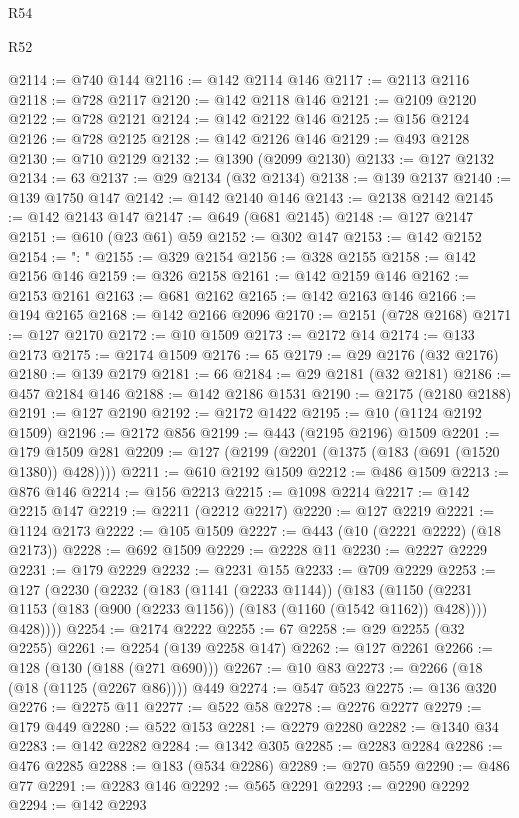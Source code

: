 \begin{lexlean}{R54}
\begin{lexlean}{R52}
\begin{coremodule}
{{{{{{{{{{{{{{{{{{{{{{{{{{{{{{{{{{{{{{{{{{{{{{{{{{{{{{{{{{{{{{{{{{{{{{{{{{{{{{{{{{{{{{{{{{{{{{{{{{{{{{{{{{{{{{{{{{{{{{{{{{{{{{{{{{{{{{{{{{{{{{{{{{{{{{{{{{{{{{{{{{{{{{{{{{{{{{{{{{{{{{{{{{{{{{{{{{{{{{@2114 := @740 @144
@2116 := @142 @2114 @146
@2117 := @2113 @2116
@2118 := @728 @2117
@2120 := @142 @2118 @146
@2121 := @2109 @2120
@2122 := @728 @2121
@2124 := @142 @2122 @146
@2125 := @156 @2124
@2126 := @728 @2125
@2128 := @142 @2126 @146
@2129 := @493 @2128
@2130 := @710 @2129
@2132 := @1390 (@2099 @2130)
@2133 := @127 @2132
@2134 := 63
@2137 := @29 @2134 (@32 @2134)
@2138 := @139 @2137
@2140 := @139 @1750 @147
@2142 := @142 @2140 @146
@2143 := @2138 @2142
@2145 := @142 @2143 @147
@2147 := @649 (@681 @2145)
@2148 := @127 @2147
@2151 := @610 (@23 @61) @59
@2152 := @302 @147
@2153 := @142 @2152
@2154 := ": "
@2155 := @329 @2154
@2156 := @328 @2155
@2158 := @142 @2156 @146
@2159 := @326 @2158
@2161 := @142 @2159 @146
@2162 := @2153 @2161
@2163 := @681 @2162
@2165 := @142 @2163 @146
@2166 := @194 @2165
@2168 := @142 @2166 @2096
@2170 := @2151 (@728 @2168)
@2171 := @127 @2170
@2172 := @10 @1509
@2173 := @2172 @14
@2174 := @133 @2173
@2175 := @2174 @1509
@2176 := 65
@2179 := @29 @2176 (@32 @2176)
@2180 := @139 @2179
@2181 := 66
@2184 := @29 @2181 (@32 @2181)
@2186 := @457 @2184 @146
@2188 := @142 @2186 @1531
@2190 := @2175 (@2180 @2188)
@2191 := @127 @2190
@2192 := @2172 @1422
@2195 := @10 (@1124 @2192 @1509)
@2196 := @2172 @856
@2199 := @443 (@2195 @2196) @1509
@2201 := @179 @1509 @281
@2209 := @127 (@2199 (@2201 (@1375 (@183 (@691 (@1520 @1380)) @428))))
@2211 := @610 @2192 @1509
@2212 := @486 @1509
@2213 := @876 @146
@2214 := @156 @2213
@2215 := @1098 @2214
@2217 := @142 @2215 @147
@2219 := @2211 (@2212 @2217)
@2220 := @127 @2219
@2221 := @1124 @2173
@2222 := @105 @1509
@2227 := @443 (@10 (@2221 @2222) (@18 @2173))
@2228 := @692 @1509
@2229 := @2228 @11
@2230 := @2227 @2229
@2231 := @179 @2229
@2232 := @2231 @155
@2233 := @709 @2229
@2253 := @127
    (@2230
      (@2232
        (@183
          (@1141 (@2233 @1144))
          (@183
            (@1150 (@2231 @1153 (@183 (@900 (@2233 @1156)) (@183 (@1160 (@1542 @1162)) @428))))
            @428))))
@2254 := @2174 @2222
@2255 := 67
@2258 := @29 @2255 (@32 @2255)
@2261 := @2254 (@139 @2258 @147)
@2262 := @127 @2261
@2266 := @128 (@130 (@188 (@271 @690)))
@2267 := @10 @83
@2273 := @2266 (@18 (@18 (@1125 (@2267 @86)))) @449
@2274 := @547 @523
@2275 := @136 @320
@2276 := @2275 @11
@2277 := @522 @58
@2278 := @2276 @2277
@2279 := @179 @449
@2280 := @522 @153
@2281 := @2279 @2280
@2282 := @1340 @34
@2283 := @142 @2282
@2284 := @1342 @305
@2285 := @2283 @2284
@2286 := @476 @2285
@2288 := @183 (@534 @2286)
@2289 := @270 @559
@2290 := @486 @77
@2291 := @2283 @146
@2292 := @565 @2291
@2293 := @2290 @2292
@2294 := @142 @2293
}}}}}}}}}}}}}}}}}}}}}}}}}}}}}}}}}}}}}}}}}}}}}}}}}}}}}}}}}}}}}}}}}}}}}}}}}}}}}}}}}}}}}}}}}}}}}}}}}}}}}}}}}}}}}}}}}}}}}}}}}}}}}}}}}}}}}}}}}}}}}}}}}}}}}}}}}}}}}}}}}}}}}}}}}}}}}}}}}}}}}}}}}}}}}}}}}}}}}}
\end{coremodule}
\end{lexlean}
\end{lexlean}
